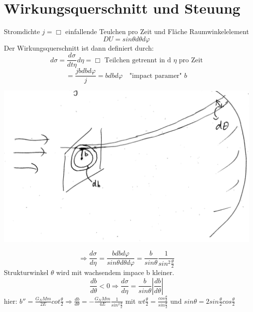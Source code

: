 \documentclass[11pt]{article}
\begin{document}
\section{Wirkungsquerschnitt und Steuung}
	Stromdichte $ j = \Box $ einfallende Teulchen pro Zeit und Fläche Raumwinkelelement 
	\[ DU = sin \theta d \theta d \varphi \]
	Der Wirkungsquerschnitt ist dann definiert durch:
	\[ d \sigma = \frac{d \sigma}{dt \eta} d\eta  = \Box \text{ Teilchen getrennt in d $\eta$ pro Zeit} \]
	\[ =\frac{j b d b d \varphi}{j}  = b d b d \varphi \quad \text{"impact paramer" } b \]
	\begin{center}
		\includegraphics[scale=0.5]{winkelquerschnitt.png}
	\end{center}
\[ \Rightarrow \frac{d \sigma }{d \eta} = \frac{b d b d \varphi}{sin \theta d \theta d \varphi}  = \frac{b}{sin \theta} \frac{1}{sin^2 \frac{\theta}{2} }  \]
Strukturwinkel $\theta $ wird mit wachsendem impace b kleiner.
\[ \frac{db}{d\theta} < 0 \Rightarrow \frac{d \sigma }{d \eta}  = \frac{b}{sin \theta} |\frac{db}{d \theta}| \]
hier: $b ''= \frac{G_N Mm}{2E} cot \frac{\theta}{2} \Rightarrow \frac{db}{d\theta} = - \frac{G_N Mm}{4E} \frac{1}{sin^2 \frac{\theta}{2}} $ 
mit $wt \frac{ \theta}{2} = \frac{cos \frac{\theta}{2}}{sin \frac{\theta}{2}} $ und $sin \theta = 2 sin \frac{\theta}{2} cos \frac{\theta}{2} $  
	
\end{document}
